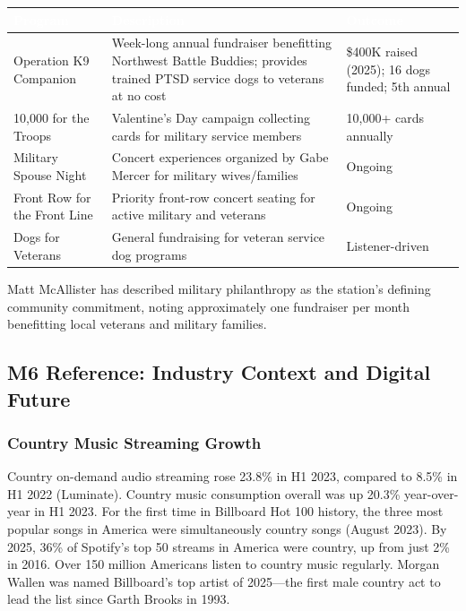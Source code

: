 \documentclass[11pt,letterpaper]{article}
\newcommand{\tableheader}[1]{\textbf{\sffamily\textcolor{white}{#1}}}
\begin{document}
\begin{center}
\begin{tabularx}{\textwidth}{L{3cm}XC{2.5cm}}
\toprule
{}
\tableheader{Program} & \tableheader{Description} & \tableheader{Outcome} \\
\midrule
Operation K9 Companion & Week-long annual fundraiser benefitting Northwest Battle Buddies; provides trained PTSD service dogs to veterans at no cost & \$400K raised (2025); 16 dogs funded; 5th annual \\
10,000 for the Troops & Valentine's Day campaign collecting cards for military service members & 10,000+ cards annually \\
Military Spouse Night & Concert experiences organized by Gabe Mercer for military wives/families & Ongoing \\
Front Row for the Front Line & Priority front-row concert seating for active military and veterans & Ongoing \\
Dogs for Veterans & General fundraising for veteran service dog programs & Listener-driven \\
\bottomrule
\end{tabularx}
\end{center}

Matt McAllister has described military philanthropy as the station's defining community commitment, noting approximately one fundraiser per month benefitting local veterans and military families.

\subsection{M6 Reference: Industry Context and Digital Future}

\subsubsection{Country Music Streaming Growth}

Country on-demand audio streaming rose 23.8\% in H1 2023, compared to 8.5\% in H1 2022 (Luminate). Country music consumption overall was up 20.3\% year-over-year in H1 2023. For the first time in Billboard Hot 100 history, the three most popular songs in America were simultaneously country songs (August 2023). By 2025, 36\% of Spotify's top 50 streams in America were country, up from just 2\% in 2016. Over 150 million Americans listen to country music regularly. Morgan Wallen was named Billboard's top artist of 2025---the first male country act to lead the list since Garth Brooks in 1993.
\end{document}
